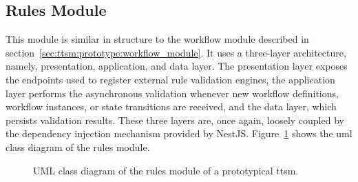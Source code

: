 \subsection{Rules Module}
\label{sec:ttsm:prototype:rules_module}
This module is similar in structure to the workflow module described in section~\ref{sec:ttsm:prototype:workflow_module}. It uses a three-layer architecture, namely, presentation, application, and data layer. The presentation layer exposes the endpoints used to register external rule validation engines, the application layer performs the asynchronous validation whenever new workflow definitions, workflow instances, or state transitions are received, and the data layer, which persists validation results. These three layers are, once again, loosely coupled by the dependency injection mechanism provided by NestJS\@. Figure~\ref{fig:prototype:rules_module_class_diagram} shows the \gls{uml} class diagram of the rules module.

\begin{figure}[h]
    \caption{UML class diagram of the rules module of a prototypical \gls{ttsm}.}
    \label{fig:prototype:rules_module_class_diagram}
\end{figure}


